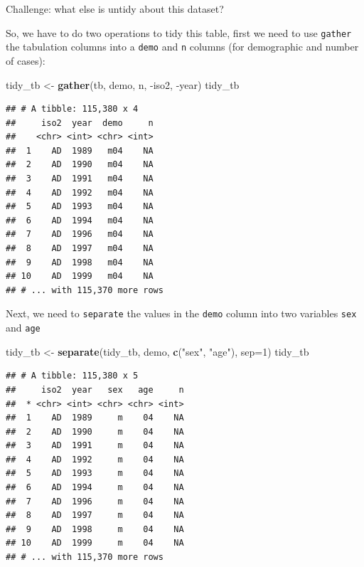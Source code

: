\documentclass[]{article}
\newenvironment{Shaded}{\begin{snugshade}}{\end{snugshade}}
\newcommand{\KeywordTok}[1]{\textcolor[rgb]{0.13,0.29,0.53}{\textbf{{#1}}}}
\newcommand{\DataTypeTok}[1]{\textcolor[rgb]{0.13,0.29,0.53}{{#1}}}
\newcommand{\DecValTok}[1]{\textcolor[rgb]{0.00,0.00,0.81}{{#1}}}
\newcommand{\StringTok}[1]{\textcolor[rgb]{0.31,0.60,0.02}{{#1}}}
\newcommand{\NormalTok}[1]{{#1}}
\theoremstyle{definition}
\theoremstyle{definition}
\theoremstyle{remark}
\begin{document}
Challenge: what else is untidy about this dataset?

So, we have to do two operations to tidy this table, first we need to
use \texttt{gather} the tabulation columns into a \texttt{demo} and
\texttt{n} columns (for demographic and number of cases):

\begin{Shaded}
\begin{Highlighting}[]
\NormalTok{tidy_tb <-}\StringTok{ }\KeywordTok{gather}\NormalTok{(tb, demo, n, -iso2, -year)}
\NormalTok{tidy_tb}
\end{Highlighting}
\end{Shaded}

\begin{verbatim}
## # A tibble: 115,380 x 4
##     iso2  year  demo     n
##    <chr> <int> <chr> <int>
##  1    AD  1989   m04    NA
##  2    AD  1990   m04    NA
##  3    AD  1991   m04    NA
##  4    AD  1992   m04    NA
##  5    AD  1993   m04    NA
##  6    AD  1994   m04    NA
##  7    AD  1996   m04    NA
##  8    AD  1997   m04    NA
##  9    AD  1998   m04    NA
## 10    AD  1999   m04    NA
## # ... with 115,370 more rows
\end{verbatim}

Next, we need to \texttt{separate} the values in the \texttt{demo}
column into two variables \texttt{sex} and \texttt{age}

\begin{Shaded}
\begin{Highlighting}[]
\NormalTok{tidy_tb <-}\StringTok{ }\KeywordTok{separate}\NormalTok{(tidy_tb, demo, }\KeywordTok{c}\NormalTok{(}\StringTok{"sex"}\NormalTok{, }\StringTok{"age"}\NormalTok{), }\DataTypeTok{sep=}\DecValTok{1}\NormalTok{)}
\NormalTok{tidy_tb}
\end{Highlighting}
\end{Shaded}

\begin{verbatim}
## # A tibble: 115,380 x 5
##     iso2  year   sex   age     n
##  * <chr> <int> <chr> <chr> <int>
##  1    AD  1989     m    04    NA
##  2    AD  1990     m    04    NA
##  3    AD  1991     m    04    NA
##  4    AD  1992     m    04    NA
##  5    AD  1993     m    04    NA
##  6    AD  1994     m    04    NA
##  7    AD  1996     m    04    NA
##  8    AD  1997     m    04    NA
##  9    AD  1998     m    04    NA
## 10    AD  1999     m    04    NA
## # ... with 115,370 more rows
\end{verbatim}
\end{document}
